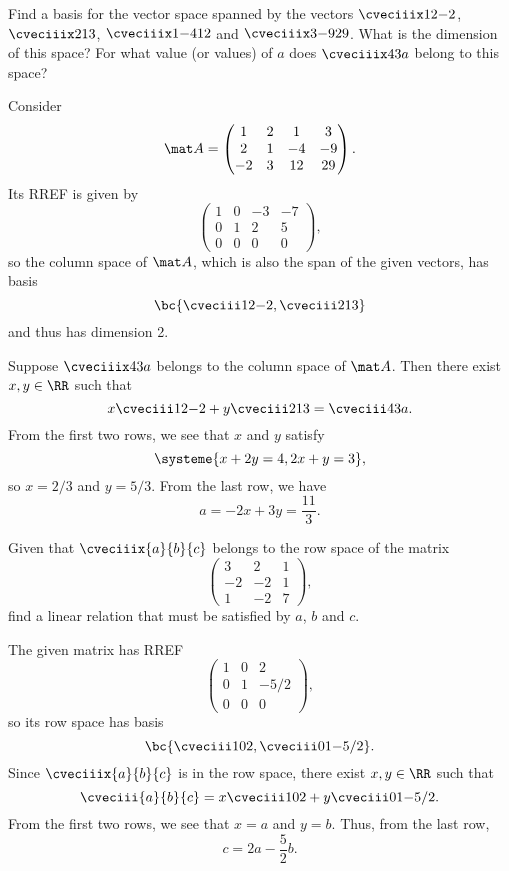 \begin{problem}
    Find a basis for the vector space spanned by the vectors $\cveciiix12{-2}$, $\cveciiix213$, $\cveciiix1{-4}{12}$ and $\cveciiix3{-9}{29}$. What is the dimension of this space? For what value (or values) of $a$ does $\cveciiix43a$ belong to this space?
\end{problem}
\begin{ppart}
    Consider \[\mat A = \begin{pmatrix}1 & 2 & 1 & 3 \\ 2 & 1 & -4 & -9 \\ -2 & 3 & 12 & 29\end{pmatrix}.\] Its RREF is given by \[\begin{pmatrix}1 & 0 & -3 & -7 \\ 0 & 1 & 2 & 5 \\ 0 & 0 & 0 & 0\end{pmatrix},\] so the column space of $\mat A$, which is also the span of the given vectors, has basis \[\bc{\cveciii12{-2}, \cveciii213}\] and thus has dimension 2.

    Suppose $\cveciiix43a$ belongs to the column space of $\mat A$. Then there exist $x, y \in \RR$ such that \[x \cveciii12{-2} + y \cveciii213 = \cveciii43a.\] From the first two rows, we see that $x$ and $y$ satisfy \[\systeme{x + 2y = 4, 2x + y = 3},\] so $x = 2/3$ and $y = 5/3$. From the last row, we have \[a = -2x + 3y = \frac{11}3.\]
\end{ppart}

\begin{problem}
    Given that $\cveciiix{a}{b}{c}$ belongs to the row space of the matrix \[\begin{pmatrix}3 & 2 & 1 \\ -2 & -2 & 1 \\ 1 & -2 & 7\end{pmatrix},\] find a linear relation that must be satisfied by $a$, $b$ and $c$.
\end{problem}
\begin{solution}
    The given matrix has RREF \[\begin{pmatrix}1 & 0 & 2 \\ 0 & 1 & -5/2 \\ 0 & 0 & 0\end{pmatrix},\] so its row space has basis \[\bc{\cveciii102, \cveciii01{-5/2}}.\] Since $\cveciiix{a}{b}{c}$ is in the row space, there exist $x, y \in \RR$ such that \[\cveciii{a}{b}{c} = x \cveciii102 + y \cveciii01{-5/2}.\] From the first two rows, we see that $x = a$ and $y = b$. Thus, from the last row, \[c = 2a - \frac52 b.\]
\end{solution}

